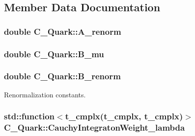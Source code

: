 \subsection{Member Data Documentation}
\hypertarget{class_c___quark_ac5de0438d1b19d8a7f7509efff53b978}{
\subsubsection[{A\-\_\-renorm}]{\setlength{\rightskip}{0pt plus 5cm}double C\-\_\-\-Quark\-::\-A\-\_\-renorm\hspace{0.3cm}{\ttfamily [protected]}}}\label{class_c___quark_ac5de0438d1b19d8a7f7509efff53b978}
\hypertarget{class_c___quark_aaa7b2b26853f8405c2b9b293d2c18a64}{
\subsubsection[{B\-\_\-mu}]{\setlength{\rightskip}{0pt plus 5cm}double C\-\_\-\-Quark\-::\-B\-\_\-mu\hspace{0.3cm}{\ttfamily [protected]}}}\label{class_c___quark_aaa7b2b26853f8405c2b9b293d2c18a64}
\hypertarget{class_c___quark_a3bcdcd4f5f0e106f159542b782044b31}{
\subsubsection[{B\-\_\-renorm}]{\setlength{\rightskip}{0pt plus 5cm}double C\-\_\-\-Quark\-::\-B\-\_\-renorm\hspace{0.3cm}{\ttfamily [protected]}}}\label{class_c___quark_a3bcdcd4f5f0e106f159542b782044b31}


Renormalization constants. 

\hypertarget{class_c___quark_a1dbb8f78522434bceefdb7b42aa1c96c}{
\subsubsection[{Cauchy\-Integraton\-Weight\-\_\-lambda}]{\setlength{\rightskip}{0pt plus 5cm}std\-::function$<${\bf t\-\_\-cmplx}({\bf t\-\_\-cmplx}, {\bf t\-\_\-cmplx})$>$ C\-\_\-\-Quark\-::\-Cauchy\-Integraton\-Weight\-\_\-lambda\hspace{0.3cm}{\ttfamily [protected]}}}\label{class_c___quark_a1dbb8f78522434bceefdb7b42aa1c96c}


